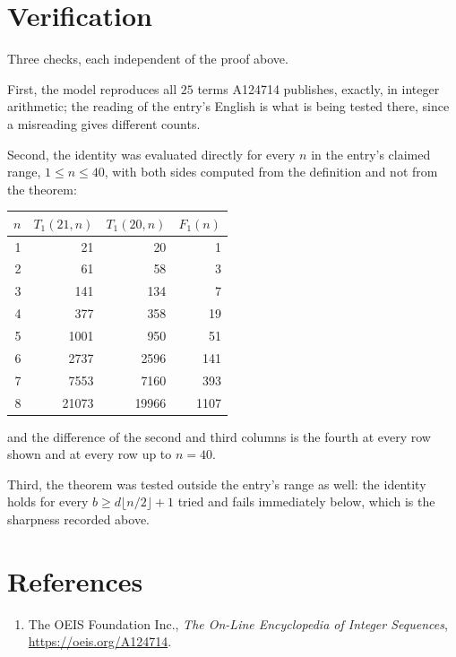 \documentclass[11pt,a4paper]{article}
\theoremstyle{plain}
\theoremstyle{definition}
\begin{document}
\section{Verification}

Three checks, each independent of the proof above.

First, the model reproduces all $25$ terms A124714 publishes, exactly, in integer
arithmetic; the reading of the entry's English is what is being tested there, since a
misreading gives different counts.

Second, the identity was evaluated directly for every $n$ in the entry's claimed range,
$1\le n\le40$, with both sides computed from the definition and not from the theorem:

\begin{center}
\begin{tabular}{rrrr}
$n$ & $T_{1}(21,n)$ & $T_{1}(20,n)$ & $F_{1}(n)$ \\ \hline
1 & 21 & 20 & 1 \\
2 & 61 & 58 & 3 \\
3 & 141 & 134 & 7 \\
4 & 377 & 358 & 19 \\
5 & 1001 & 950 & 51 \\
6 & 2737 & 2596 & 141 \\
7 & 7553 & 7160 & 393 \\
8 & 21073 & 19966 & 1107 \\
\end{tabular}
\end{center}

\noindent and the difference of the second and third columns is the fourth at every row shown
and at every row up to $n=40$.

Third, the theorem was tested outside the entry's range as well: the identity holds for every
$b\ge d\lfloor n/2\rfloor+1$ tried and fails immediately below, which is the sharpness recorded
above.

\section*{References}
\begin{enumerate}
\item The OEIS Foundation Inc., \emph{The On-Line Encyclopedia of Integer Sequences},
\url{https://oeis.org/A124714}.
\end{enumerate}
\end{document}

